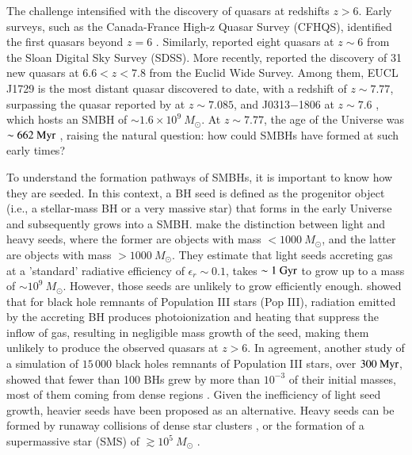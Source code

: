 The challenge intensified with the discovery of quasars at redshifts $z>6$. Early surveys, such as the Canada-France High-z Quasar Survey (CFHQS), identified the first quasars beyond $z=6$ \citep{willott2007four}. Similarly, \citet{jiang2015discovery} reported eight quasars at $z\sim6$ from the Sloan Digital Sky Survey (SDSS). More recently, \citet{yang2026euclid} reported the discovery of 31 new quasars at $6.6 < z < 7.8$ \citep{yang2026euclid} from the Euclid Wide Survey. Among them, EUCL J1729 is the most distant quasar discovered to date, with a redshift of $z \sim 7.77$, surpassing the quasar reported by \citet{mortlock2011luminous} at $z\sim 7.085$, and J0313−1806 at $z\sim7.6$ \citep{wang2021luminous}, which hosts an SMBH of $\sim 1.6 \times 10^9~M_{\odot}$. At $z \sim 7.77$, the age of the Universe was $\sim 662~{\rm Myr}$ \citep{yang2026euclid}, raising the natural question: how could SMBHs have formed at such early times?

To understand the formation pathways of SMBHs, it is important to know how they are seeded. In this context, a BH seed is defined as the progenitor object (i.e., a stellar-mass BH or a very massive star) that forms in the early Universe and subsequently grows into a SMBH. \citet{regan2024massive} make the distinction between light and heavy seeds, where the former are objects with mass $< 1000~M_{\odot}$, and the latter are objects with mass $> 1000~M_{\odot}$. They estimate that light seeds accreting gas at a 'standard' radiative efficiency of $\epsilon_{r} \sim 0.1$, takes $\sim 1~{\rm Gyr}$ to grow up to a mass of $\sim 10^9~M_{\odot}$. However, those seeds are unlikely to grow efficiently enough. \citet{alvarez2009accretion} showed that for black hole remnants of Population III stars (Pop III), radiation emitted by the accreting BH produces photoionization and heating that suppress the inflow of gas, resulting in negligible mass growth of the seed, making them unlikely to produce the observed quasars at $z>6$. In agreement, another study of  a simulation of $15\,000$ black holes remnants of Population III stars, over $300~{\rm Myr}$, showed that fewer than 100 BHs grew by more than $10^{-3}$ of their initial masses, most of them coming from dense regions \citep{smith2018growth}. Given the inefficiency of light seed growth, heavier seeds have been proposed as an alternative. Heavy seeds can be formed by runaway collisions of dense star clusters \citep{escala2021observational,portegies2004formation}, or the formation of a supermassive star (SMS) of $\gtrsim 10^5~M_{\odot}$  \citep{woods2017maximum}.

